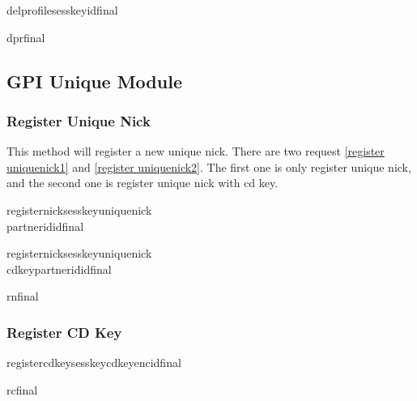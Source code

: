 \documentclass[oneside,titlepage,a4paper]{Definition/retrospy} %
\begin{document}
\begin{mybox}
	\tbs delprofile\tbs\tbs sesskey\tbs<session key>\tbs id\tbs<operation id>\tbs final\tbs
\end{mybox}
\ServerResponse

\begin{mybox}
	\tbs dpr\tbs final\tbs
\end{mybox}



\subsection{GPI Unique Module}

\subsubsection{Register Unique Nick}
This method will register a new unique nick. There are two request \ref{register uniquenick1} and \ref{register uniquenick2}. The first one is only register unique nick, and the second one is register unique nick with cd key.
\ClientRequest
\begin{mybox}[label=register uniquenick1]
	\tbs registernick\tbs\tbs sesskey\tbs<session key>\tbs uniquenick\tbs<unique nick>\\\tbs partnerid\tbs<partner id>\tbs id\tbs<operation id>\tbs final\tbs
\end{mybox}
\begin{mybox}[label=register uniquenick2]
	\tbs registernick\tbs\tbs sesskey\tbs<session key>\tbs uniquenick\tbs<unique nick>\\\tbs cdkey\tbs<cd key>\tbs partnerid\tbs<partner id>\tbs id\tbs<operation id>\tbs final\tbs
\end{mybox}

\ServerResponse
\begin{mybox}
	\tbs rn\tbs final\tbs
\end{mybox}


\subsubsection{Register CD Key}
\ClientRequest
\begin{mybox}
	\tbs registercdkey\tbs\tbs sesskey\tbs<session key>\tbs cdkeyenc\tbs<cd key enc string>\tbs id\tbs <operation id>\tbs final\tbs
\end{mybox}
\ServerResponse
\begin{mybox}
	\tbs rc\tbs final\tbs
\end{mybox}
\end{document}
